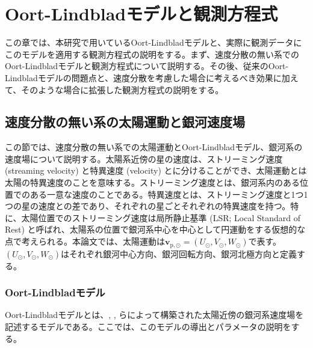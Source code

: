 


\chapter{Oort-Lindbladモデルと観測方程式 \label{chap2}}
この章では、本研究で用いているOort-Lindbladモデルと、実際に観測データにこのモデルを適用する観測方程式の説明をする。まず、速度分散の無い系でのOort-Lindbladモデルと観測方程式について説明する。その後、従来のOort-Lindbladモデルの問題点と、速度分散を考慮した場合に考えるべき効果に加えて、そのような場合に拡張した観測方程式の説明をする。
\section{速度分散の無い系の太陽運動と銀河速度場} %
この節では、速度分散の無い系での太陽運動とOort-Lindbladモデル、銀河系の速度場について説明する。太陽系近傍の星の速度は、ストリーミング速度 (streaming velocity) と特異速度 (velocity) とに分けることができ、太陽運動とは太陽の特異速度のことを意味する。ストリーミング速度とは、銀河系内のある位置でのある一意な速度のことである。特異速度とは、ストリーミング速度と1つ1つの星の速度との差であり、それぞれの星ごとそれぞれの特異速度を持つ。特に、太陽位置でのストリーミング速度は局所静止基準 (LSR; Local Standard of Rest) と呼ばれ、太陽系の位置で銀河系中心を中心として円運動をする仮想的な点で考えられる。本論文では、太陽運動は$\pmb{v}_{\mathrm{p},\odot} = (U_{\odot},V_{\odot},W_{\odot})$で表す。$(U_{\odot},V_{\odot},W_{\odot})$はそれぞれ銀河中心方向、銀河回転方向、銀河北極方向と定義する。


\subsection{Oort-Lindbladモデル} %
Oort-Lindbladモデルとは、\cite{Oort1927b}, \cite{Lindblad1927}, \cite{Chandra42}らによって構築された太陽近傍の銀河系速度場を記述するモデルである。ここでは、このモデルの導出とパラメータの説明をする。

